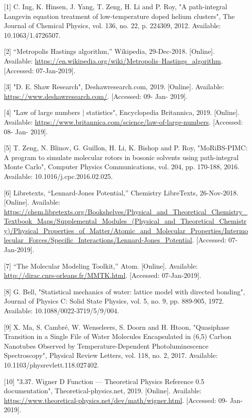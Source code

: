 \documentclass[11pt]{article}
\begin{document}
[1] C. Ing, K. Hinsen, J. Yang, T. Zeng, H. Li and P. Roy, "A path-integral Langevin equation treatment of low-temperature doped helium clusters", The Journal of Chemical Physics, vol. 136, no. 22, p. 224309, 2012. Available: 10.1063/1.4726507.

[2] “Metropolis Hastings algorithm,” Wikipedia, 29-Dec-2018. [Online]. 
\\ Available: \url{https://en.wikipedia.org/wiki/Metropolis–Hastings_algorithm}. [Accessed: 07-Jan-2019]. 

[3] "D. E. Shaw Research", Deshawresearch.com, 2019. [Online]. Available: \url{https://www.deshawresearch.com/}. [Accessed: 09- Jan- 2019].

[4] "Law of large numbers | statistics", Encyclopedia Britannica, 2019. [Online]. Available: \url{https://www.britannica.com/science/law-of-large-numbers}. [Accessed: 08- Jan- 2019].

[5] T. Zeng, N. Blinov, G. Guillon, H. Li, K. Bishop and P. Roy, "MoRiBS-PIMC: A program to simulate molecular rotors in bosonic solvents using path-integral Monte Carlo", Computer Physics Communications, vol. 204, pp. 170-188, 2016. Available: 10.1016/j.cpc.2016.02.025.

[6] Libretexts, “Lennard-Jones Potential,” Chemistry LibreTexts, 26-Nov-2018. [Online]. 
Available: \url{https://chem.libretexts.org/Bookshelves/Physical_and_Theoretical_Chemistry_Textbook_Maps/Supplemental_Modules_(Physical_and_Theoretical_Chemistry)/Physical_Properties_of_Matter/Atomic_and_Molecular_Properties/Intermolecular_Forces/Specific_Interactions/Lennard-Jones_Potential}. 
[Accessed: 07-Jan-2019]. 

[7] “The Molecular Modeling Toolkit,” Atom. [Online]. Available: \url{http://dirac.cnrs-orleans.fr/MMTK.html}. [Accessed: 07-Jan-2019]. 

[8] G. Bell, "Statistical mechanics of water: lattice model with directed bonding", Journal of Physics C: Solid State Physics, vol. 5, no. 9, pp. 889-905, 1972. Available: 10.1088/0022-3719/5/9/004.

[9] X. Ma, S. Cambré, W. Wenseleers, S. Doorn and H. Htoon, "Quasiphase Transition in a Single File of Water Molecules Encapsulated in (6,5) Carbon Nanotubes Observed by Temperature-Dependent Photoluminescence Spectroscopy", Physical Review Letters, vol. 118, no. 2, 2017. Available: 10.1103/physrevlett.118.027402.

[10] "3.37. Wigner D Function — Theoretical Physics Reference 0.5 documentation", Theoretical-physics.net, 2019. [Online]. Available: \url{https://www.theoretical-physics.net/dev/math/wigner.html}. [Accessed: 09- Jan- 2019].
\end{document}
